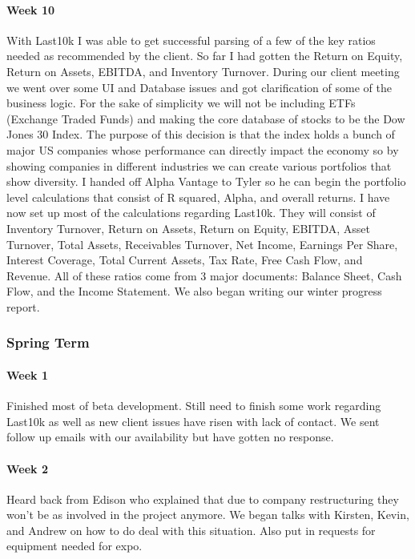\documentclass[onecolumn, draftclsnofoot,10pt, compsoc]{IEEEtran}
\begin{document}
    \paragraph{Week 10} 
    With Last10k I was able to get successful parsing of a few of the key ratios needed as recommended by the client. So far I had gotten the Return on Equity, Return on Assets, EBITDA, and Inventory Turnover. During our client meeting we went over some UI and Database issues and got clarification of some of the business logic. For the sake of simplicity we will not be including ETFs (Exchange Traded Funds) and making the core database of stocks to be the Dow Jones 30 Index. The purpose of this decision is that the index holds a bunch of major US companies whose performance can directly impact the economy so by showing companies in different industries we can create various portfolios that show diversity. I handed off Alpha Vantage to Tyler so he can begin the portfolio level calculations that consist of R squared, Alpha, and overall returns. I have now set up most of the calculations regarding Last10k. They will consist of  Inventory Turnover, Return on Assets, Return on Equity, EBITDA, Asset Turnover, Total Assets, Receivables Turnover, Net Income, Earnings Per Share, Interest Coverage, Total Current Assets, Tax Rate, Free Cash Flow, and Revenue. All of these ratios come from 3 major documents: Balance Sheet, Cash Flow, and the Income Statement. We also began writing our winter progress report. 
    
\subsubsection{Spring Term} 
    \paragraph{Week 1} 
    Finished most of beta development. Still need to finish some work regarding Last10k as well as new client issues have risen with lack of contact. We sent follow up emails with our availability but have gotten no response.

    \paragraph{Week 2} 
    Heard back from Edison who explained that due to company restructuring they won't be as involved in the project anymore. We began talks with Kirsten, Kevin, and Andrew on how to do deal with this situation. Also put in requests for equipment needed for expo. 
\end{document}
